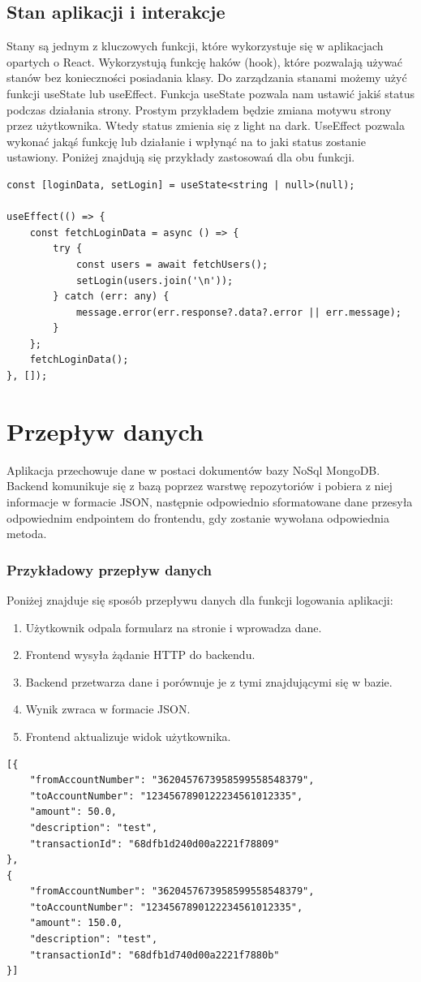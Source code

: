 \subsection*{Stan aplikacji i interakcje}
Stany są jednym z kluczowych funkcji, które wykorzystuje się w aplikacjach opartych o React. Wykorzystują funkcję haków (hook), które pozwalają używać stanów bez konieczności posiadania klasy. Do zarządzania stanami możemy użyć funkcji useState lub useEffect. Funkcja useState pozwala nam ustawić jakiś status podczas działania strony. Prostym przykładem będzie zmiana motywu strony przez użytkownika. Wtedy status zmienia się z light na dark. UseEffect pozwala wykonać jakąś funkcję lub działanie i wpłynąć na to jaki status zostanie ustawiony. Poniżej znajdują się przykłady zastosowań dla obu funkcji.
\begin{lstlisting}[caption={Wykorzystanie stanów}, label={lst:TS-states}]
const [loginData, setLogin] = useState<string | null>(null);
	
useEffect(() => {
	const fetchLoginData = async () => {
		try {
			const users = await fetchUsers();
			setLogin(users.join('\n'));
		} catch (err: any) {
			message.error(err.response?.data?.error || err.message);
		}
	};
	fetchLoginData();
}, []);
\end{lstlisting}
\section{Przepływ danych}
Aplikacja przechowuje dane w postaci dokumentów bazy NoSql MongoDB. Backend komunikuje się z bazą poprzez warstwę repozytoriów i pobiera z niej informacje w formacie JSON, następnie odpowiednio sformatowane dane przesyła odpowiednim endpointem do frontendu, gdy zostanie wywołana odpowiednia metoda.
\subsubsection*{Przykładowy przepływ danych}
Poniżej znajduje się sposób przepływu danych dla funkcji logowania aplikacji:
\begin{enumerate}
	\item Użytkownik odpala formularz na stronie i wprowadza dane.
	\item Frontend wysyła żądanie HTTP do backendu.
	\item Backend przetwarza dane i porównuje je z tymi znajdującymi się w bazie.
	\item Wynik zwraca w formacie JSON.
	\item Frontend aktualizuje widok użytkownika.
\end{enumerate}
\begin{lstlisting}[caption={Przykład przesyłanych danych między frontendem, a backendem}, label={lst:TS-service1}]
[{
	"fromAccountNumber": "3620457673958599558548379",
	"toAccountNumber": "1234567890122234561012335",
	"amount": 50.0,
	"description": "test",
	"transactionId": "68dfb1d240d00a2221f78809"
},
{
	"fromAccountNumber": "3620457673958599558548379",
	"toAccountNumber": "1234567890122234561012335",
	"amount": 150.0,
	"description": "test",
	"transactionId": "68dfb1d740d00a2221f7880b"
}]
\end{lstlisting}
